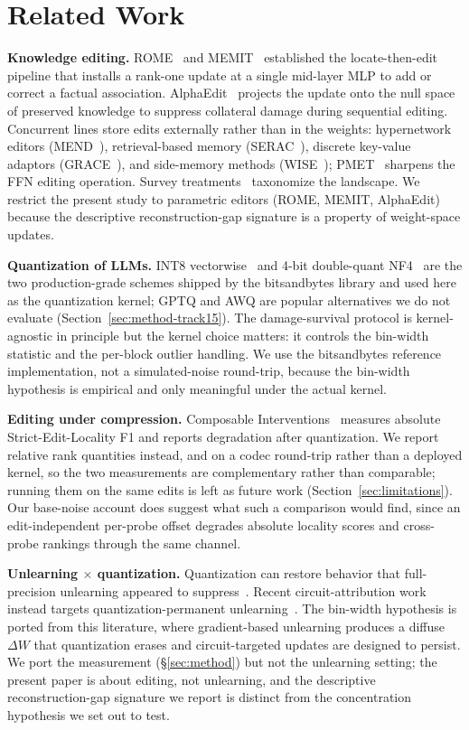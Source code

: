 \documentclass[preprint,12pt]{elsarticle}
\begin{document}
\section{Related Work}
\label{sec:related}

\textbf{Knowledge editing.} ROME~\cite{rome2022} and MEMIT~\cite{memit2023} established
the locate-then-edit pipeline that installs a rank-one update at a single mid-layer
MLP to add or correct a factual association. AlphaEdit~\cite{alphaedit2025} projects
the update onto the null space of preserved knowledge to suppress collateral damage
during sequential editing. Concurrent lines store edits externally rather than in the
weights: hypernetwork editors (MEND~\cite{mend2022}), retrieval-based memory
(SERAC~\cite{serac2022}), discrete key-value adaptors (GRACE~\cite{grace2023}), and
side-memory methods (WISE~\cite{wise2024}); PMET~\cite{pmet2024} sharpens the FFN
editing operation. Survey treatments~\cite{kesurvey2023,knowedit2024} taxonomize the
landscape. We restrict the present study to parametric editors (ROME, MEMIT,
AlphaEdit) because the descriptive reconstruction-gap signature is a property of
weight-space updates.

\textbf{Quantization of LLMs.} INT8 vectorwise~\cite{llmint82022} and 4-bit
double-quant NF4~\cite{qlora2023} are the two production-grade schemes shipped by
the bitsandbytes library and used here as the quantization kernel; GPTQ and AWQ are
popular alternatives we do not evaluate
(Section~\ref{sec:method-track15}). The damage-survival protocol is kernel-
agnostic in principle but the kernel choice matters: it controls the bin-width
statistic and the per-block outlier handling. We use the bitsandbytes reference
implementation, not a simulated-noise round-trip, because the bin-width hypothesis is
empirical and only meaningful under the actual kernel.

\textbf{Editing under compression.} Composable Interventions~\cite{composable2024}
measures absolute Strict-Edit-Locality F1 and reports degradation after quantization.
We report relative rank quantities instead, and on a codec round-trip rather than a
deployed kernel, so the two measurements are complementary rather than comparable;
running them on the same edits is left as future work
(Section~\ref{sec:limitations}). Our base-noise account does suggest what such a
comparison would find, since an edit-independent per-probe offset degrades absolute
locality scores and cross-probe rankings through the same channel.

\textbf{Unlearning $\times$ quantization.} Quantization can restore behavior that
full-precision unlearning appeared to suppress~\cite{quantunlearningfailure2025}.
Recent circuit-attribution work instead targets quantization-permanent
unlearning~\cite{forgettingsticks2026}. The bin-width hypothesis is ported from this
literature, where gradient-based unlearning produces a diffuse $\Delta W$ that
quantization erases and circuit-targeted updates are designed to persist. We port the
measurement (\S\ref{sec:method}) but not the unlearning setting; the present paper is
about editing, not unlearning, and the descriptive reconstruction-gap signature we
report is distinct from the concentration hypothesis we set out to test.
\end{document}

